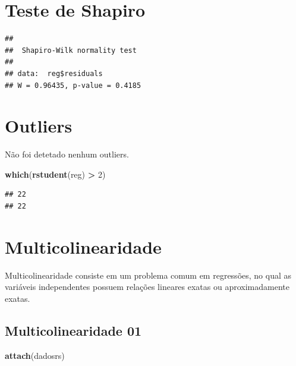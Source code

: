 \documentclass[]{article}
\newenvironment{Shaded}{\begin{snugshade}}{\end{snugshade}}
\newcommand{\KeywordTok}[1]{\textcolor[rgb]{0.13,0.29,0.53}{\textbf{#1}}}
\newcommand{\DecValTok}[1]{\textcolor[rgb]{0.00,0.00,0.81}{#1}}
\newcommand{\StringTok}[1]{\textcolor[rgb]{0.31,0.60,0.02}{#1}}
\newcommand{\OperatorTok}[1]{\textcolor[rgb]{0.81,0.36,0.00}{\textbf{#1}}}
\newcommand{\NormalTok}[1]{#1}
\begin{document}
\section{Teste de Shapiro}\label{teste-de-shapiro}

\begin{Shaded}
\end{Shaded}

\begin{verbatim}
## 
##  Shapiro-Wilk normality test
## 
## data:  reg$residuals
## W = 0.96435, p-value = 0.4185
\end{verbatim}

\section{Outliers}\label{outliers}

Não foi detetado nenhum outliers.

\begin{Shaded}
\begin{Highlighting}[]
\KeywordTok{which}\NormalTok{(}\KeywordTok{rstudent}\NormalTok{(reg) }\OperatorTok{>}\StringTok{ }\DecValTok{2}\NormalTok{)}
\end{Highlighting}
\end{Shaded}

\begin{verbatim}
## 22 
## 22
\end{verbatim}

\section{Multicolinearidade}\label{multicolinearidade}

Multicolinearidade consiste em um problema comum em regressões, no qual
as variáveis independentes possuem relações lineares exatas ou
aproximadamente exatas.

\subsection{Multicolinearidade 01}\label{multicolinearidade-01}

\begin{Shaded}
\begin{Highlighting}[]
\KeywordTok{attach}\NormalTok{(dadosrs)}
\end{Highlighting}
\end{Shaded}
\end{document}
